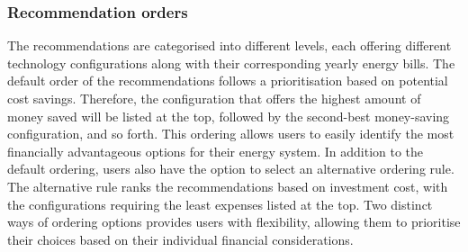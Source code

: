 \subsubsection{Recommendation orders}
The recommendations are categorised into different levels, 
each offering different technology configurations along with their corresponding yearly energy bills. 
The default order of the recommendations follows a prioritisation based on potential cost savings. 
Therefore, the configuration that offers the highest amount of money saved will be listed at the top, followed by the second-best money-saving configuration, and so forth. 
This ordering allows users to easily identify the most financially advantageous options for their energy system.
In addition to the default ordering, users also have the option to select an alternative ordering rule. 
The alternative rule ranks the recommendations based on investment cost, with the configurations requiring the least expenses listed at the top. 
Two distinct ways of ordering options provides users with flexibility, allowing them to prioritise their choices based on their individual financial considerations. 

%


